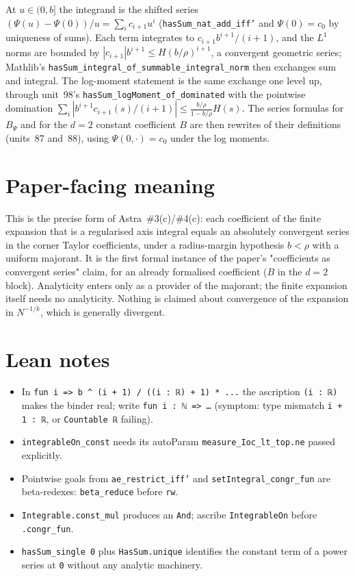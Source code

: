 \documentclass[11pt]{article}
\begin{document}
At $u\in(0,b]$ the integrand is the shifted series $(\Psi(u)-\Psi(0))/u=\sum_ic_{i+1}u^i$
(\texttt{hasSum\_nat\_add\_iff'} and $\Psi(0)=c_0$ by uniqueness of sums). Each term integrates to
$c_{i+1}b^{i+1}/(i+1)$, and the $L^1$ norms are bounded by $|c_{i+1}|b^{i+1}\le H(b/\rho)^{i+1}$,
a convergent geometric series; Mathlib's \texttt{hasSum\_integral\_of\_summable\_integral\_norm}
then exchanges sum and integral. The log-moment statement is the same exchange one level up, through
unit~98's \texttt{hasSum\_logMoment\_of\_dominated} with the pointwise domination
$\sum_i|b^{i+1}c_{i+1}(s)/(i+1)|\le\frac{b/\rho}{1-b/\rho}H(s)$. The series formulas for
$B_\Psi$ and for the $d=2$ constant coefficient $B$ are then rewrites of their definitions
(units~87 and~88), using $\Psi(0,\cdot)=c_0$ under the log moments.

\section{Paper-facing meaning}

This is the precise form of Astra~\#3(c)/\#4(c): each coefficient of the finite expansion that is
a regularised axis integral equals an absolutely convergent series in the corner Taylor
coefficients, under a radius-margin hypothesis $b<\rho$ with a uniform majorant. It is the first
formal instance of the paper's "coefficients as convergent series" claim, for an already
formalised coefficient ($B$ in the $d=2$ block). Analyticity enters only as a provider of the
majorant; the finite expansion itself needs no analyticity. Nothing is claimed about convergence of
the expansion in $N^{-1/k}$, which is generally divergent.

\section{Lean notes}

\begin{itemize}
\item In \texttt{fun i => b \^{} (i + 1) / ((i : ℝ) + 1) * ...} the ascription \texttt{(i : ℝ)}
makes the binder real; write \texttt{fun i : ℕ => …} (symptom: type mismatch \texttt{i + 1 : ℝ},
or \texttt{Countable ℝ} failing).
\item \texttt{integrableOn\_const} needs its autoParam \texttt{measure\_Ioc\_lt\_top.ne} passed
explicitly.
\item Pointwise goals from \texttt{ae\_restrict\_iff'} and \texttt{setIntegral\_congr\_fun} are
beta-redexes: \texttt{beta\_reduce} before \texttt{rw}.
\item \texttt{Integrable.const\_mul} produces an \texttt{And}; ascribe \texttt{IntegrableOn} before
\texttt{.congr\_fun}.
\item \texttt{hasSum\_single 0} plus \texttt{HasSum.unique} identifies the constant term of a
power series at \texttt{0} without any analytic machinery.
\end{itemize}
\end{document}
